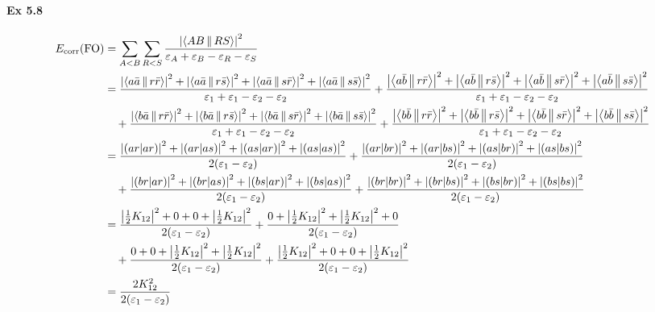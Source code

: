 \documentclass[a4paper]{article}
\DeclareMathOperator{\corr}{\mathrm{corr}}
\newcommand{\ex}[1]{\paragraph{Ex #1}}
\numberwithin{equation}{subsection}
\begin{document}
\ex{5.8}
\begin{align}
E_{\corr}(\text{FO}) &= \sum_{A<B}\sum_{R<S} \dfrac{\abs{\Braket{AB||RS}}^2}{\varepsilon_A + \varepsilon_B - \varepsilon_R - \varepsilon_S} \notag\\
&= \dfrac{\abs{\Braket{a\bar{a}||r\bar{r}}}^2 + \abs{\Braket{a\bar{a}||r\bar{s}}}^2 + \abs{\Braket{a\bar{a}||s\bar{r}}}^2 + \abs{\Braket{a\bar{a}||s\bar{s}}}^2}{\varepsilon_1 + \varepsilon_1 - \varepsilon_2 - \varepsilon_2} %
+ \dfrac{\abs{\Braket{a\bar{b}||r\bar{r}}}^2 + \abs{\Braket{a\bar{b}||r\bar{s}}}^2 + \abs{\Braket{a\bar{b}||s\bar{r}}}^2 + \abs{\Braket{a\bar{b}||s\bar{s}}}^2}{\varepsilon_1 + \varepsilon_1 - \varepsilon_2 - \varepsilon_2} \notag\\
&{}\quad + \dfrac{\abs{\Braket{b\bar{a}||r\bar{r}}}^2 + \abs{\Braket{b\bar{a}||r\bar{s}}}^2 + \abs{\Braket{b\bar{a}||s\bar{r}}}^2 + \abs{\Braket{b\bar{a}||s\bar{s}}}^2}{\varepsilon_1 + \varepsilon_1 - \varepsilon_2 - \varepsilon_2} %
+ \dfrac{\abs{\Braket{b\bar{b}||r\bar{r}}}^2 + \abs{\Braket{b\bar{b}||r\bar{s}}}^2 + \abs{\Braket{b\bar{b}||s\bar{r}}}^2 + \abs{\Braket{b\bar{b}||s\bar{s}}}^2}{\varepsilon_1 + \varepsilon_1 - \varepsilon_2 - \varepsilon_2} \notag\\
&= \dfrac{\abs{(ar|ar)}^2 + \abs{(ar|as)}^2 + \abs{(as|ar)}^2 + \abs{(as|as)}^2}{2(\varepsilon_1 - \varepsilon_2)} 
+ \dfrac{\abs{(ar|br)}^2 + \abs{(ar|bs)}^2 + \abs{(as|br)}^2 + \abs{(as|bs)}^2}{2(\varepsilon_1 - \varepsilon_2)} \notag\\
&{}\quad + \dfrac{\abs{(br|ar)}^2 + \abs{(br|as)}^2 + \abs{(bs|ar)}^2 + \abs{(bs|as)}^2}{2(\varepsilon_1 - \varepsilon_2)} 
+ \dfrac{\abs{(br|br)}^2 + \abs{(br|bs)}^2 + \abs{(bs|br)}^2 + \abs{(bs|bs)}^2}{2(\varepsilon_1 - \varepsilon_2)} \notag\\
&= \dfrac{\abs{\tfrac{1}{2}K_{12}}^2 + 0 + 0 + \abs{\tfrac{1}{2}K_{12}}^2}{2(\varepsilon_1 - \varepsilon_2)} 
+ \dfrac{0 + \abs{\tfrac{1}{2}K_{12}}^2 + \abs{\tfrac{1}{2}K_{12}}^2 + 0}{2(\varepsilon_1 - \varepsilon_2)} \notag\\
&{}\quad + \dfrac{0 + 0 + \abs{\tfrac{1}{2}K_{12}}^2 + \abs{\tfrac{1}{2}K_{12}}^2}{2(\varepsilon_1 - \varepsilon_2)} 
+ \dfrac{\abs{\tfrac{1}{2}K_{12}}^2 + 0 + 0 + \abs{\tfrac{1}{2}K_{12}}^2}{2(\varepsilon_1 - \varepsilon_2)} \notag\\
&= \dfrac{2K_{12}^2 }{2(\varepsilon_1 - \varepsilon_2)}
\end{align}
\end{document}
